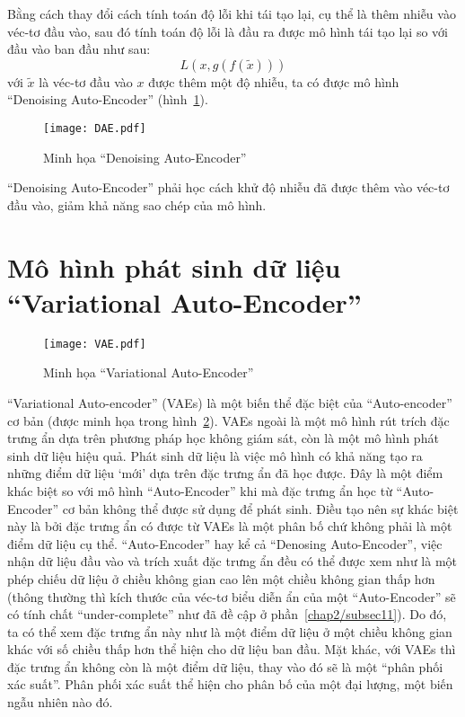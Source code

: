     Bằng cách thay đổi cách tính toán độ lỗi khi tái tạo lại, cụ thể là thêm nhiễu vào véc-tơ đầu vào, 
    sau đó tính toán độ lỗi là đầu ra được mô hình tái tạo lại so với đầu vào ban đầu như sau:
    \begin{equation}
        L(x, g(f(\tilde{x})))
    \end{equation}
    với 
    \begin{math} \tilde{x} \end{math}
    là véc-tơ đầu vào 
    \begin{math}
        x
    \end{math} 
    được thêm một độ nhiễu, ta có được mô hình ``Denoising Auto-Encoder'' (hình~\ref{fig_DAE}). 
    \begin{figure}
        \centering
        \texttt{[image: DAE.pdf]}
        \caption{Minh họa ``Denoising Auto-Encoder''}
        \label{fig_DAE}
    \end{figure}
    
    ``Denoising Auto-Encoder'' phải học cách khử độ nhiễu đã được thêm vào véc-tơ đầu vào,
    giảm khả năng sao chép của mô hình.






\section{Mô hình phát sinh dữ liệu ``Variational Auto-Encoder''} \label{chap2/sec2}
        \begin{figure}
            \centering
            \texttt{[image: VAE.pdf]}
            \caption{Minh họa ``Variational Auto-Encoder''}
            \label{fig_VAE}
        \end{figure}
        ``Variational Auto-encoder'' (VAEs) là một biến thể đặc biệt của ``Auto-encoder'' cơ bản (được minh họa trong hình~\ref{fig_VAE}). 
        VAEs ngoài là một mô hình rút trích đặc trưng ẩn dựa trên phương pháp học không giám sát, còn là một mô hình phát sinh dữ liệu hiệu quả. 
        Phát sinh dữ liệu là việc mô hình có khả năng tạo ra những điểm dữ liệu `mới' dựa trên đặc trưng ẩn đã học được.
        Đây là một điểm khác biệt so với mô hình ``Auto-Encoder'' khi mà đặc trưng ẩn học từ ``Auto-Encoder'' cơ bản không thể được sử dụng để phát sinh. 
        Điều tạo nên sự khác biệt này là bởi đặc trưng ẩn có được từ VAEs là một phân bố chứ không phải là một điểm dữ liệu cụ thể. 
        ``Auto-Encoder'' hay kể cả ``Denosing Auto-Encoder'', việc nhận dữ liệu đầu vào và trích xuất đặc trưng ẩn đều có thể được xem như là một phép chiếu dữ liệu ở chiều không gian cao lên một chiều không gian thấp hơn (thông thường thì kích thước của véc-tơ biểu diễn ẩn của một ``Auto-Encoder'' sẽ có tính chất ``under-complete'' như đã đề cập ở phần~\ref{chap2/subsec11}). 
        Do đó, ta có thể xem đặc trưng ẩn này như là một điểm dữ liệu ở một chiều không gian khác với số chiều thấp hơn thể hiện cho dữ liệu ban đầu. 
        Mặt khác, với VAEs thì đặc trưng ẩn không còn là một điểm dữ liệu, thay vào đó sẽ là một ``phân phối xác suất''. 
        Phân phối xác suất thể hiện cho phân bố của một đại lượng, một biến ngẫu nhiên nào đó.
    
